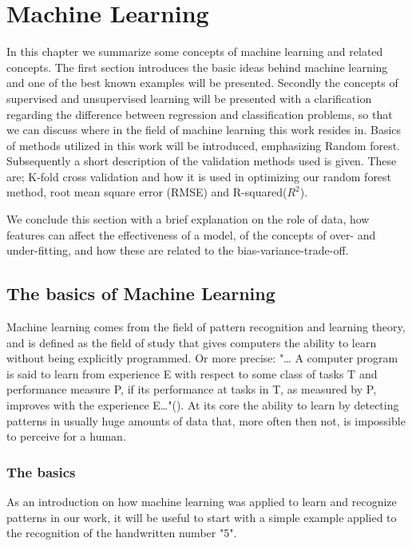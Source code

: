 	
	
\pagebreak
\section{Machine Learning}

In this chapter we summarize some concepts of machine learning and related concepts. The first section introduces the basic ideas behind machine learning and one of the best known examples will be presented. Secondly the concepts of supervised and unsupervised learning will be presented with a clarification regarding the difference between regression and classification problems, so that we can discuss where in the field of machine learning this work resides in. Basics of methods utilized in this work will be introduced, emphasizing Random forest. Subsequently a short description of the validation methods used is given. These are; K-fold cross validation and how it is used in optimizing our random forest method, root mean square error (RMSE) and R-squared($R^2$).

We conclude this section with a brief explanation on the role of data, how features can affect the effectiveness of a model, of the concepts of over- and under-fitting, and how these are related to the bias-variance-trade-off.




\subsection{The basics of Machine Learning}

Machine learning comes from the field of pattern recognition and learning theory, and is defined as the field of study that gives computers the ability to learn without being explicitly programmed. Or more precise: "… A computer program is said to learn from experience E with respect to some class of tasks T and performance measure P, if its performance at tasks in T, as measured by P, improves with the experience E…"(\cite{mitchell1997machine}). At its core the ability to learn by detecting patterns in usually huge amounts of data that, more often then not, is impossible to perceive for a human.


	\subsubsection{The basics}\label{sec:introexample}
	As an introduction on how machine learning was applied to learn and recognize patterns in our work, it will be useful to start with a simple example applied to the recognition of the handwritten number "5".
	

